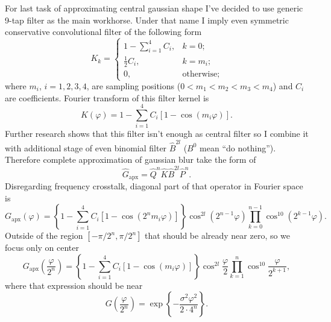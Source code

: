 \documentclass[10pt]{article}
\begin{document}
For last task of approximating central gaussian shape I've decided to use generic 9-tap filter as
the main workhorse. Under that name I imply even symmetric conservative convolutional filter of the
following form
\begin{equation}\label{main}
    K_k = \left\{
        \begin{array}{ll}
            1 - \sum_{i=1}^4 C_i,& k = 0;\\
            \frac12 C_i,& k = m_i;\\
            0,& \text{otherwise};
        \end{array}
    \right.
\end{equation}
where $m_i$, $i=1, 2, 3, 4$, are sampling positions ($0 < m_1 < m_2 < m_3 < m_4$) and $C_i$ are
coefficients. Fourier transform of this filter kernel is
\begin{equation}
    K(\varphi) = 1 - \sum_{i=1}^4 C_i[1 - \cos(m_i\varphi)].
\end{equation}
Further research shows that this filter isn't enough as central filter so I combine it with
additional stage of even binomial filter $\hat B^{2l}$ ($B^0$ mean ``do nothing''). Therefore
complete approximation of gaussian blur take the form of
\begin{equation}
    \hat G_{\text{apx}} = \hat Q^n\hat K\hat B^{2l}\hat P^n.
\end{equation}
Disregarding frequency crosstalk, diagonal part of that operator in Fourier space is
\begin{equation}
    G_{\text{apx}}(\varphi) = \left\{1 - \sum_{i=1}^4 C_i[1 - \cos(2^nm_i\varphi)]\right\}
        \cos^{2l}(2^{n-1}\varphi) \prod_{k=0}^{n-1} \cos^{10}(2^{k-1}\varphi).
\end{equation}
Outside of the region $[-\pi/2^n, \pi/2^n]$ that should be already near zero, so we focus only on
center
\begin{equation}
    G_{\text{apx}}\left(\frac\varphi{2^n}\right) =
        \left\{1 - \sum_{i=1}^4 C_i[1 - \cos(m_i\varphi)]\right\}
        \cos^{2l}\frac\varphi2 \prod_{k=1}^n \cos^{10}\frac\varphi{2^{k+1}},
\end{equation}
where that expression should be near
\begin{equation}
    G\left(\frac\varphi{2^n}\right) = \exp\left\{-\frac{\sigma^2\varphi^2}{2\cdot4^n}\right\}.
\end{equation}
\end{document}
